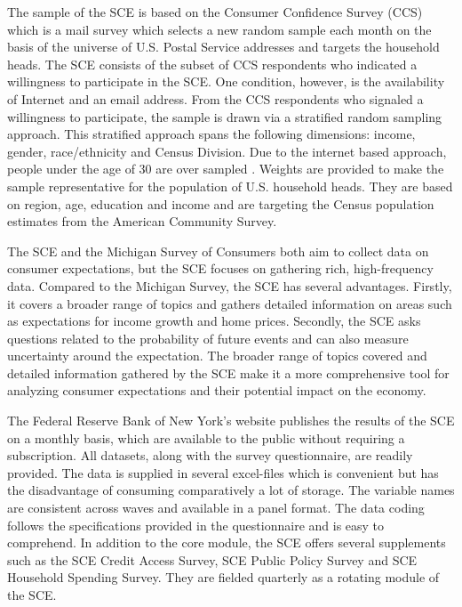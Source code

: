 \documentclass[11pt,a4paper,leqno]{article}
\begin{document}
The sample of the SCE is based on the Consumer Confidence Survey (CCS) which is a mail survey which selects a new random sample each month on the basis of the universe of U.S. Postal Service addresses and targets the household heads. The SCE consists of the subset of CCS respondents who indicated a willingness to participate in the SCE. One condition, however, is the availability of Internet and an email address. From the CCS respondents who signaled a willingness to participate, the sample is drawn via a stratified random sampling approach. This stratified approach spans the following dimensions: income, gender, race/ethnicity and Census Division.   Due to the internet based approach, people under the age of 30 are over sampled \parencite{SCEOverview}. Weights are provided to make the sample representative for the population of U.S. household heads. They are based on region, age, education and income and are targeting the Census population estimates from the American Community Survey. 

The SCE and the Michigan Survey of Consumers both aim to collect data on consumer expectations, but the SCE focuses on gathering rich, high-frequency data. Compared to the Michigan Survey, the SCE has several advantages. Firstly, it covers a broader range of topics and gathers detailed information on areas such as expectations for income growth and home prices. Secondly, the SCE asks questions related to the probability of future events and can also measure uncertainty around the expectation. The broader range of topics covered and detailed information gathered by the SCE make it a more comprehensive tool for analyzing consumer expectations and their potential impact on the economy.

The Federal Reserve Bank of New York's website publishes the results of the SCE on a monthly basis, which are available to the public without requiring a subscription.  All datasets, along with the survey questionnaire, are readily provided. The data is supplied in several excel-files which is convenient but has the disadvantage of consuming comparatively a lot of storage. The variable names are consistent across waves and available in a panel format. The data coding follows the specifications provided in the questionnaire and is easy to comprehend. In addition to the core module, the SCE offers several supplements such as the SCE Credit Access Survey, SCE Public Policy Survey and SCE Household Spending Survey. They are fielded quarterly as a rotating module of the SCE. 
\end{document}
